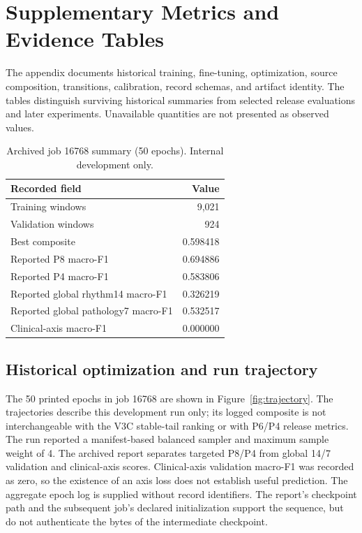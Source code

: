 \documentclass[life,article,submit,moreauthors]{Definitions/mdpi}
\begin{document}
\appendixstart
\appendix

\section{Supplementary Metrics and Evidence Tables}
\label{appendix:supplement}
The appendix documents historical training, fine-tuning, optimization, source composition, transitions, calibration, record schemas, and artifact identity. The tables distinguish surviving historical summaries from selected release evaluations and later experiments. Unavailable quantities are not presented as observed values.

\begin{table}[htbp]
\caption{Archived job 16768 summary (50 epochs). Internal development only.\label{tab:app_shared}}
\centering\small
\begin{tabular}{lr}
\toprule
Recorded field & Value \\
\midrule
Training windows & 9,021 \\
Validation windows & 924 \\
Best composite & 0.598418 \\
Reported P8 macro-F1 & 0.694886 \\
Reported P4 macro-F1 & 0.583806 \\
Reported global rhythm14 macro-F1 & 0.326219 \\
Reported global pathology7 macro-F1 & 0.532517 \\
Clinical-axis macro-F1 & 0.000000 \\
\bottomrule
\end{tabular}
\end{table}

\subsection{Historical optimization and run trajectory}
\label{sec:trajectory}
The 50 printed epochs in job 16768 are shown in Figure~\ref{fig:trajectory}. The trajectories describe this development run only; its logged composite is not interchangeable with the V3C stable-tail ranking or with P6/P4 release metrics. The run reported a manifest-based balanced sampler and maximum sample weight of 4. The archived report separates targeted P8/P4 from global 14/7 validation and clinical-axis scores. Clinical-axis validation macro-F1 was recorded as zero, so the existence of an axis loss does not establish useful prediction. The aggregate epoch log is supplied without record identifiers. The report's checkpoint path and the subsequent job's declared initialization support the sequence, but do not authenticate the bytes of the intermediate checkpoint.
\end{document}
